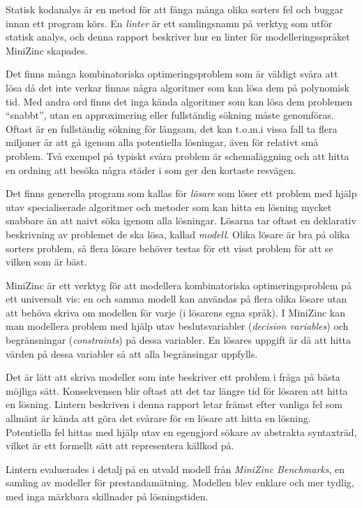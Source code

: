 \documentclass[a4paper,12pt]{article}
\newcommand{\leblanc}{\clearpage\thispagestyle{empty}\null\clearpage}
\begin{document}
\leblanc

\begin{sammanfattning}
Statisk kodanalys är en metod för att fånga många olika sorters fel och buggar innan
ett program körs. En \emph{linter} är ett samlingsnamn på verktyg som utför
statisk analys, och denna rapport beskriver hur en linter för modelleringsspråket MiniZinc
skapades.

Det finns många kombinatoriska optimeringsproblem som är väldigt svåra att lösa då det inte verkar finnas
några algoritmer
som kan lösa dem på polynomisk tid. Med andra ord finns det inga kända algoritmer som kan lösa
dem problemen ``snabbt'', utan en approximering eller fullständig sökning måste genomföras.
Oftast är en fullständig sökning för långsam, det kan t.o.m.\@ i vissa fall ta flera miljoner år att gå
igenom alla potentiella lösningar, även för relativt små problem.
Två exempel på typiskt svåra problem är schemaläggning och att hitta en ordning att besöka några städer
i som ger den kortaste resvägen.

Det finns generella program som kallas för \emph{lösare} som löser ett problem med hjälp
utav specialiserade algoritmer och metoder som kan hitta en lösning mycket snabbare än att
naivt söka igenom alla lösningar. Lösarna tar oftast en deklarativ beskrivning
av problemet de ska lösa, kallad \emph{modell}. Olika lösare är bra på olika sorters problem, så
flera lösare behöver testas för ett visst problem för att se vilken som är bäst.

MiniZinc är ett verktyg för att modellera kombinatoriska optimeringsproblem på ett universalt vis: en
och samma modell kan användas på flera olika lösare utan att behöva skriva om modellen för
varje (i lösarens egna språk). I MiniZinc kan man modellera problem med hjälp utav beslutsvariabler (\emph{decision
variables}) och begränsningar (\emph{constraints}) på dessa variabler. En lösares uppgift är då att
hitta värden på dessa variabler så att alla begränsingar uppfylls.

Det är lätt att skriva modeller som inte beskriver ett problem i fråga på bästa möjliga
sätt. Konsekvensen blir oftast att det tar längre tid för lösaren att hitta en lösning.
Lintern beskriven i denna rapport letar främst efter vanliga fel som allmänt är kända att
göra det svårare för en lösare att hitta en lösning. Potentiella fel hittas med hjälp utav
en egengjord sökare av abstrakta syntaxträd, vilket är ett formellt sätt att representera källkod på.

Lintern evaluerades i detalj på en utvald modell från \emph{MiniZinc Benchmarks}, en samling av
modeller för prestandamätning. Modellen blev enklare och mer tydlig, med inga märkbara skillnader på lösningstiden.
\end{sammanfattning}
\end{document}
